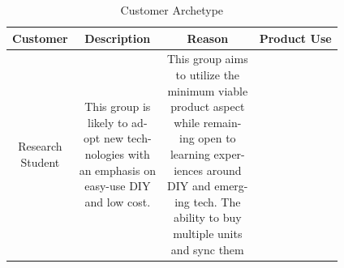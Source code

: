 \documentclass[journal]{IEEEtran}
\begin{document}
            \begin{table}[H]
                \renewcommand{\arraystretch}{1.3}
                \caption{Customer Archetype}
                \label{table:CustArch}
                \begin{center}
                    \begin{tabular}{|c|c|c|c|}
                        \hline
                        \bfseries Customer&
                        \bfseries Description&
                        \bfseries Reason&
                        \bfseries Product Use\\
                        \hline
                        
                        \makecell[l]{Research\\Student}&
                        \makecell[l]{This group is \\
                                     likely to ad-\\
                                     opt new tech-\\
                                     nologies with\\
                                     an emphasis on\\
                                     easy-use DIY\\
                                     and low cost.}&
                        \makecell[l]{This group aims\\
                                     to utilize the\\
                                     minimum viable\\
                                     product aspect\\
                                     while remain-\\
                                     ing open to \\
                                     learning exper-\\
                                     iences around\\
                                     DIY and emerg-\\
                                     ing tech. The\\
                                     ability to buy\\ 
                                     multiple units\\
                                     and sync them\\
}
\end{tabular}
\end{center}
\end{table}
\end{document}
